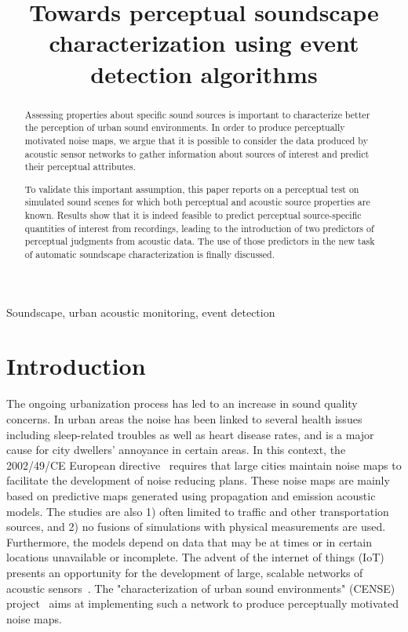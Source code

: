 \documentclass{article}
\title{Towards perceptual soundscape characterization using event detection algorithms}
\begin{document}
\ninept
\maketitle

\begin{sloppy}

\begin{abstract}
Assessing properties about specific sound sources is important to  characterize better the perception of urban sound environments. In order to produce perceptually motivated noise maps, we argue that it is possible to consider the data produced by acoustic sensor networks to gather information about sources of interest and predict their perceptual attributes.

To validate this important assumption, this paper reports on a perceptual test on simulated sound scenes for which both perceptual and acoustic source properties are known. Results show that it is indeed feasible to predict perceptual source-specific quantities of interest from recordings, leading to the introduction of two predictors of perceptual judgments from acoustic data. The use of those predictors in the new task of automatic soundscape characterization is finally discussed.

\end{abstract}

\begin{keywords}
  Soundscape, urban acoustic monitoring, event detection
\end{keywords}

\section{Introduction}
\label{sec:intro}

The ongoing urbanization process has led to an increase in sound quality concerns. In urban areas the noise has been linked to several health issues including sleep-related troubles as well as heart disease rates, and is a major cause for city dwellers' annoyance in certain areas. In this context, the 2002/49/CE European directive~\cite{ec2002} requires that large cities maintain noise maps to facilitate the development of noise reducing plans. These noise maps are mainly based on predictive maps generated using propagation and emission acoustic models. The studies are also 1) often limited to traffic and other transportation sources, and 2) no fusions of simulations with physical measurements are used. Furthermore, the models depend on data that may be at times or in certain locations unavailable or incomplete. The advent of the internet of things (IoT) presents an opportunity for the development of large, scalable networks of acoustic sensors~\cite{mydlarz2017, gontier2017}. The "characterization of urban sound environments" (CENSE) project~\cite{picault2017} aims at implementing such a network to produce perceptually motivated noise maps.



\end{sloppy}
\end{document}
